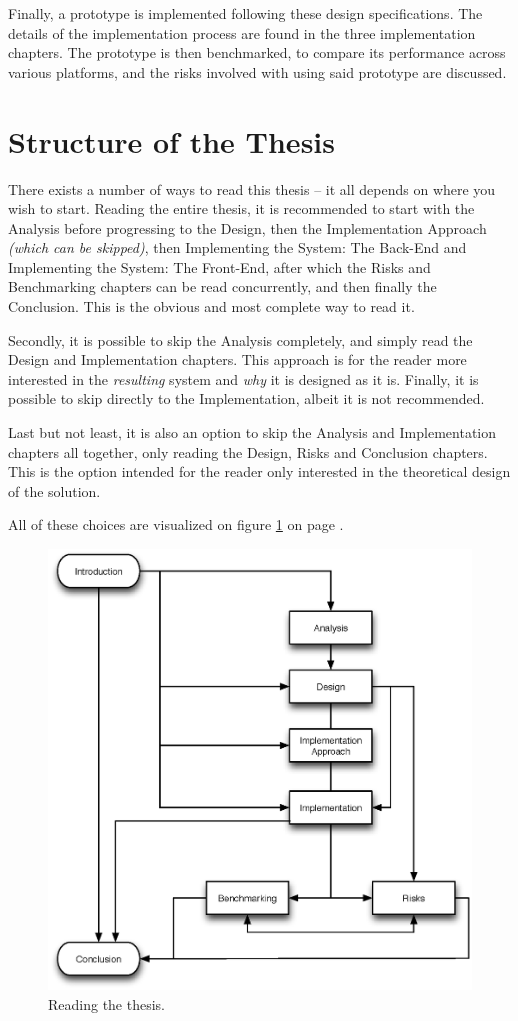 		Finally, a prototype is implemented following these design specifications. The details of the implementation process are found in the three implementation chapters. The prototype is then benchmarked, to compare its performance across various platforms, and the risks involved with using said prototype are discussed.


	\section{Structure of the Thesis}
		There exists a number of ways to read this thesis -- it all depends on where you wish to start. Reading the entire thesis, it is recommended to start with the Analysis before progressing to the Design, then the Implementation Approach \emph{(which can be skipped)}, then Implementing the System: The Back-End and Implementing the System: The Front-End, after which the Risks and Benchmarking chapters can be read concurrently, and then finally the Conclusion. This is the obvious and most complete way to read it.

		Secondly, it is possible to skip the Analysis completely, and simply read the Design and Implementation chapters. This approach is for the reader more interested in the \emph{resulting} system and \emph{why} it is designed as it is. Finally, it is possible to skip directly to the Implementation, albeit it is not recommended. 

		Last but not least, it is also an option to skip the Analysis and Implementation chapters all together, only reading the Design, Risks and Conclusion chapters. This is the option intended for the reader only interested in the theoretical design of the solution.

		All of these choices are visualized on figure \ref{fig:reading:the:thesis} on page \pageref{fig:reading:the:thesis}.



		\begin{figure}[!htb]
			\centering
			\includegraphics[width=1\textwidth]{figures/intro/reading.eps}
			\caption{Reading the thesis.}
			\label{fig:reading:the:thesis}
		\end{figure}



